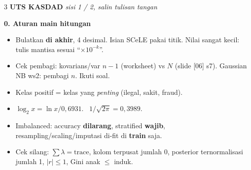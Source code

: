\documentclass[8pt]{extarticle}
\newcommand{\sect}[1]{\par\vspace{1.5pt}\colorbox{black!12}{\parbox{\dimexpr\columnwidth-2\fboxsep}{\textbf{#1}}}\par\vspace{0.8pt}}
\begin{document}
\fontsize{7.9}{9.0}\selectfont\raggedright\setlength{\emergencystretch}{1em}
\begin{multicols*}{3}
\textbf{UTS KASDAD} \hfill \textit{sisi 1 / 2, salin tulisan tangan}\par
\sect{0. Aturan main hitungan}
\begin{itemize}
\item Bulatkan \textbf{di akhir}, 4 desimal. Isian SCeLE pakai titik. Nilai sangat kecil: tulis mantisa sesuai ``$\times10^{-k}$''.
\item Cek pembagi: kovarians/var \textbf{$n-1$} (worksheet) vs $N$ (slide [06] s7). Gaussian NB ws2: pembagi $n$. Ikuti soal.
\item Kelas positif = kelas yang \emph{penting} (ilegal, sakit, fraud).
\item $\log_2 x=\ln x/0{,}6931$. \ $1/\sqrt{2\pi}=0{,}3989$.
\item Imbalanced: accuracy \textbf{dilarang}, stratified \textbf{wajib}, resampling/scaling/imputasi di-fit di \textbf{train} saja.
\item Cek silang: $\sum\lambda=\mathrm{trace}$, kolom terpusat jumlah 0, posterior ternormalisasi jumlah 1, $|r|\le1$, Gini anak $\le$ induk.
\end{itemize}


\end{multicols*}
\end{document}
